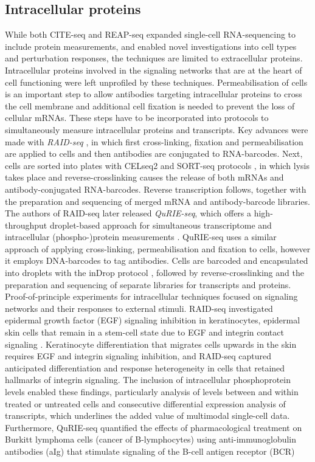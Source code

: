 \documentclass[times, twoside, watermark]{zHenriquesLab-StyleBioRxiv}
\begin{document}
\subsection*{Intracellular proteins} While both CITE-seq and REAP-seq expanded single-cell RNA-sequencing to include protein measurements, and enabled novel investigations into cell types and perturbation responses, the techniques are limited to extracellular proteins. Intracellular proteins involved in the signaling networks that are at the heart of cell functioning were left unprofiled by these techniques. Permeabilisation of cells is an important step to allow antibodies targeting intracellular proteins to cross the cell membrane and additional cell fixation is needed to prevent the loss of cellular mRNAs. These steps have to be incorporated into protocols to simultaneously measure intracellular proteins and transcripts. \newline Key advances were made with \textit{RAID-seq} \cite{Gerlach2019}, in which first cross-linking, fixation and permeabilisation are applied to cells and then antibodies are conjugated to RNA-barcodes. Next, cells are sorted into plates with CELseq2 and SORT-seq protocols \cite{Muraro2016,Hashimshony2016}, in which lysis takes place and reverse-crosslinking causes the release of both mRNAs and antibody-conjugated RNA-barcodes. Reverse transcription follows, together with the preparation and sequencing of merged mRNA and antibody-barcode libraries. \newline The authors of RAID-seq later released \textit{QuRIE-seq}, which offers a high-throughput droplet-based approach for simultaneous transcriptome and intracellular (phospho-)protein measurements \cite{Rivello2020}. QuRIE-seq uses a similar approach of applying cross-linking, permeabilisation and fixation to cells, however it employs DNA-barcodes to tag antibodies. Cells are barcoded and encapsulated into droplets with the inDrop protocol \cite{Klein2015}, followed by reverse-crosslinking and the preparation and sequencing of separate libraries for transcripts and proteins. \newline Proof-of-principle experiments for intracellular techniques focused on signaling networks and their responses to external stimuli. RAID-seq investigated epidermal growth factor (EGF) signaling inhibition in keratinocytes, epidermal skin cells that remain in a stem-cell state due to EGF and integrin contact signaling \cite{Gerlach2019}. Keratinocyte differentiation that migrates cells upwards in the skin requires EGF and integrin signaling inhibition, and RAID-seq captured anticipated differentiation and response heterogeneity in cells that retained hallmarks of integrin signaling. The inclusion of intracellular phosphoprotein levels enabled these findings, particularly analysis of levels between and within treated or untreated cells and consecutive differential expression analysis of transcripts, which underlines the added value of multimodal single-cell data. Furthermore, QuRIE-seq quantified the effects of pharmacological treatment on Burkitt lymphoma cells (cancer of B-lymphocytes) using anti-immunoglobulin antibodies (aIg) that stimulate signaling of the B-cell antigen receptor (BCR) 
\end{document}
